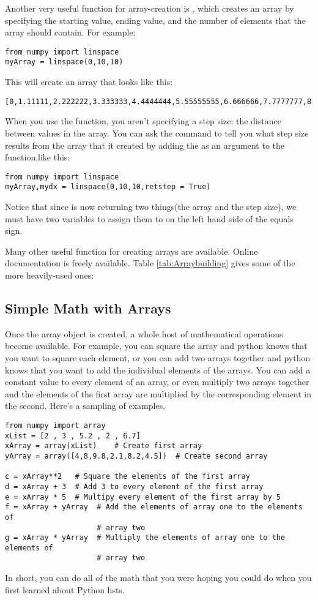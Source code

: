  Another very useful function for array-creation is ,
which creates an array by specifying the starting value, ending value,
and the number of elements that the array should contain.  For example:
\begin{Verbatim}
from numpy import linspace
myArray = linspace(0,10,10)
\end{Verbatim}
This will create an array that looks like this:
\begin{Verbatim}
[0,1.11111,2.222222,3.333333,4.4444444,5.55555555,6.666666,7.7777777,8.8888888,10]
\end{Verbatim}
When you use the  function, you aren't specifying a
step size: the distance between values in the array.  You can ask the
 command to tell you what step size results from the
array that it created by adding the  as an
argument to the function,like this:
\begin{Verbatim}
from numpy import linspace
myArray,mydx = linspace(0,10,10,retstep = True)
\end{Verbatim}
Notice that since  is now returning two things(the
array and the step size), we must have two variables to assign them to
on the left hand side of the equals sign.

Many other useful function for creating arrays are available.  Online
documentation is freely available.  Table \ref{tab:Arraybuilding}
gives some of the more heavily-used ones:

\subsection*{Simple Math with Arrays}
Once the array object is created, a whole host of mathematical
operations become available.  For example, you can square the array
and python knows that you want to square each element, or you can add
two arrays together and python knows that you want to add the
individual elements of the arrays.  You can add a constant value to
every element of an array, or even multiply two arrays together and
the elements of the first array are multiplied by the corresponding
element in the second.  Here's a sampling of examples.
\begin{Verbatim}
from numpy import array
xList = [2 , 3 , 5.2 , 2 , 6.7]
xArray = array(xList)    # Create first array
yArray = array([4,8,9.8,2.1,8.2,4.5])  # Create second array

c = xArray**2   # Square the elements of the first array
d = xArray + 3  # Add 3 to every element of the first array
e = xArray * 5  # Multipy every element of the first array by 5
f = xArray + yArray  # Add the elements of array one to the elements of
                     # array two
g = xArray * yArray  # Multiply the elements of array one to the elements of
                     # array two
\end{Verbatim}
In short, you can do all of the math that you were hoping you could do
when you first learned about Python lists.




